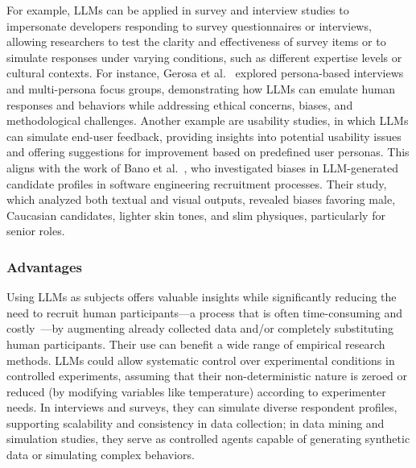 For example, LLMs can be applied in survey and interview studies to impersonate developers responding to survey questionnaires or interviews, allowing researchers to test the clarity and effectiveness of survey items or to simulate responses under varying conditions, such as different expertise levels or cultural contexts. For instance, Gerosa et al.~\cite{DBLP:journals/ase/GerosaTSS24} explored persona-based interviews and multi-persona focus groups, demonstrating how LLMs can emulate human responses and behaviors while addressing ethical concerns, biases, and methodological challenges.
Another example are usability studies, in which LLMs can simulate end-user feedback, providing insights into potential usability issues and offering suggestions for improvement based on predefined user personas. This aligns with the work of Bano et al.~\cite{bano2025doessoftwareengineerlook}, who investigated biases in LLM-generated candidate profiles in software engineering recruitment processes. Their study, which analyzed both textual and visual outputs, revealed biases favoring male, Caucasian candidates, lighter skin tones, and slim physiques, particularly for senior roles.


\subsubsection{Advantages}

Using LLMs as subjects offers valuable insights while significantly reducing the need to recruit human participants—a process that is often time-consuming and costly~\cite{DBLP:conf/vl/Madampe0HO24}—by augmenting already collected data and/or completely substituting human participants.
Their use can benefit a wide range of empirical research methods.
LLMs could allow systematic control over experimental conditions in controlled experiments, assuming that their non-deterministic nature is zeroed or reduced (by modifying variables like temperature) according to experimenter needs.
In interviews and surveys, they can simulate diverse respondent profiles, supporting scalability and consistency in data collection; in data mining and simulation studies, they serve as controlled agents capable of generating synthetic data or simulating complex behaviors.

